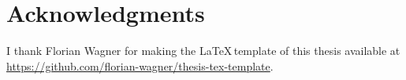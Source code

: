 \chapter*{Acknowledgments}
\setlength{\parskip}{0.68em}
\setlength{\parindent}{0em}


I thank Florian Wagner for making the \LaTeX\,template of this thesis available at \url{https://github.com/florian-wagner/thesis-tex-template}.
\setlength{\parindent}{0pt}
\setlength{\parskip}{8pt}

